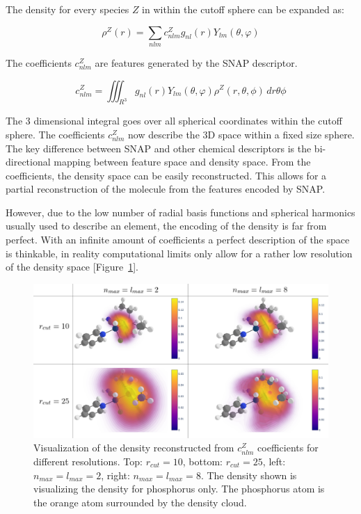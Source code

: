 The density for every species $Z$ in within the cutoff sphere can be expanded as:

$$ \rho^Z(r) = \sum_{nlm} c^Z_{nlm} g_{nl}(r) Y_{lm}(\theta, \varphi) $$

The coefficients $c_{nlm}^Z$ are features generated by the SNAP descriptor.

$$ c_{nlm}^Z = \iiint_{R^3} g_{nl}(r) Y_{lm}(\theta, \varphi) \rho^Z(r, \theta, \phi)  \,dr\theta\phi   $$

The 3 dimensional integral goes over all spherical coordinates within the cutoff sphere.
The coefficients $c^Z_{nlm}$ now describe the 3D space within a fixed size sphere.
\\
The key difference between SNAP and other chemical descriptors is the bi-directional mapping between feature space and 
density space.
From the coefficients, the density space can be easily reconstructed.
This allows for a partial reconstruction of the molecule from the features encoded by SNAP.

However, due to the low number of radial basis functions and spherical harmonics usually used to describe an element, 
the encoding of the density is far from perfect.
With an infinite amount of coefficients a perfect description of the space is thinkable,
in reality computational limits only allow for a rather low resolution of the density space [Figure~\ref{fig:snap-density}]. 
\begin{figure} [h]
  \centering
  \includegraphics[width=1\textwidth]{figures/snap/density/Densities.png} %
  \caption[SNAP density visualization]{Visualization of the density reconstructed from $c_{nlm}^Z$ coefficients for different resolutions.
  Top: $r_{cut} = 10$, bottom: $r_{cut} = 25$, left: $n_{max} = l_{max} = 2$, right: $n_{max} = l_{max} = 8$.
  The density shown is visualizing the density for phosphorus only.
  The phosphorus atom is the orange atom surrounded by the density cloud.
  }
  \label{fig:snap-density}
\end{figure}

